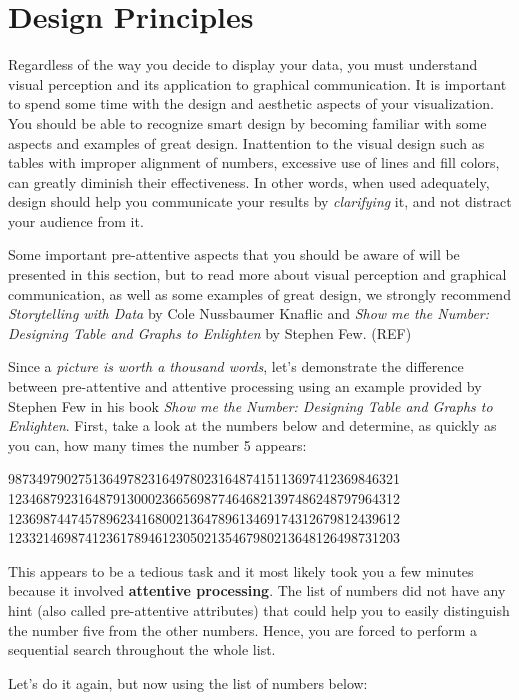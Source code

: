 \documentclass[
]{krantz}
\begin{document}
\hypertarget{design-principles}{%
\section{Design Principles}\label{design-principles}}

Regardless of the way you decide to display your data, you must understand visual perception and its application to graphical communication. It is important to spend some time with the design and aesthetic aspects of your visualization. You should be able to recognize smart design by becoming familiar with some aspects and examples of great design. Inattention to the visual design such as tables with improper alignment of numbers, excessive use of lines and fill colors, can greatly diminish their effectiveness. In other words, when used adequately, design should help you communicate your results by \emph{clarifying} it, and not distract your audience from it.

Some important pre-attentive aspects that you should be aware of will be presented in this section, but to read more about visual perception and graphical communication, as well as some examples of great design, we strongly recommend \emph{Storytelling with Data} by Cole Nussbaumer Knaflic and \emph{Show me the Number: Designing Table and Graphs to Enlighten} by Stephen Few. (REF)

Since a \emph{picture is worth a thousand words}, let's demonstrate the difference between pre-attentive and attentive processing using an example provided by Stephen Few in his book \emph{Show me the Number: Designing Table and Graphs to Enlighten}. First, take a look at the numbers below and determine, as quickly as you can, how many times the number 5 appears:

98734979027513649782316497802316487415113697412369846321
12346879231648791300023665698774646821397486248797964312
12369874474578962341680021364789613469174312679812439612
12332146987412361789461230502135467980213648126498731203

This appears to be a tedious task and it most likely took you a few minutes because it involved \textbf{attentive processing}. The list of numbers did not have any hint (also called pre-attentive attributes) that could help you to easily distinguish the number five from the other numbers. Hence, you are forced to perform a sequential search throughout the whole list.

Let's do it again, but now using the list of numbers below:
\end{document}

